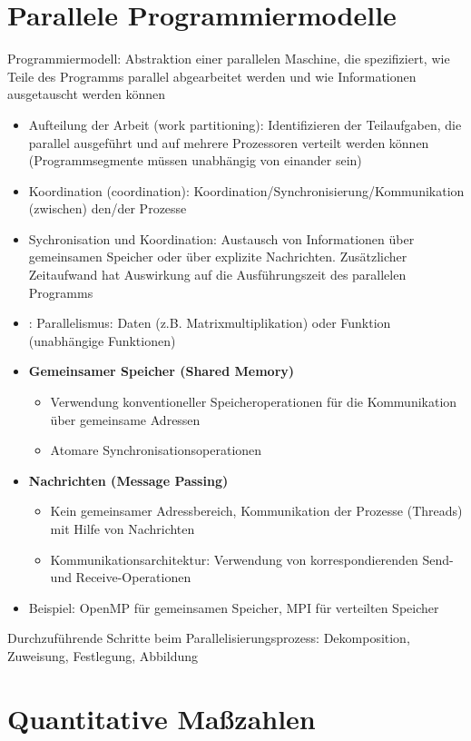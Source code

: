 \section{Parallele Programmiermodelle}
	Programmiermodell: Abstraktion einer parallelen Maschine, die spezifiziert, wie Teile des Programms parallel abgearbeitet werden und wie Informationen ausgetauscht werden können

	\begin{itemize}
		\item Aufteilung der Arbeit (work partitioning): Identifizieren der Teilaufgaben, die parallel ausgeführt und auf mehrere Prozessoren verteilt werden können (Programmsegmente müssen unabhängig von einander sein)
		\item Koordination (coordination): Koordination/Synchronisierung/Kommunikation (zwischen) den/der Prozesse
		\item Sychronisation und Koordination: Austausch von Informationen über gemeinsamen Speicher oder über explizite Nachrichten. Zusätzlicher Zeitaufwand hat Auswirkung auf die Ausführungszeit des parallelen Programms
		\item: Parallelismus: Daten (z.B. Matrixmultiplikation) oder Funktion (unabhängige Funktionen) 
		\item \textbf{Gemeinsamer Speicher (Shared Memory)}
		\begin{itemize}
			\item Verwendung konventioneller Speicheroperationen für die Kommunikation über gemeinsame Adressen
			\item Atomare Synchronisationsoperationen
		\end{itemize}
		\item \textbf{Nachrichten (Message Passing)}
		\begin{itemize}
			\item Kein gemeinsamer Adressbereich, Kommunikation der Prozesse (Threads) mit Hilfe von Nachrichten
			\item Kommunikationsarchitektur: Verwendung von korrespondierenden Send- und Receive-Operationen
		\end{itemize}
		\item Beispiel: OpenMP für gemeinsamen Speicher, MPI für verteilten Speicher
	\end{itemize}
	Durchzuführende Schritte beim Parallelisierungsprozess: Dekomposition, Zuweisung, Festlegung, Abbildung


\section{Quantitative Maßzahlen}

